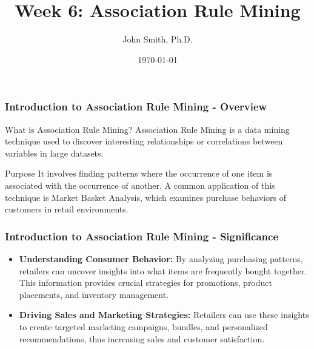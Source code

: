 \documentclass[aspectratio=169]{beamer}
\title[Association Rule Mining]{Week 6: Association Rule Mining}
\author[J. Smith]{John Smith, Ph.D.}
\institute[University Name]{
  Department of Computer Science\\
  University Name\\
  \vspace{0.3cm}
  Email: email@university.edu\\
  Website: www.university.edu
}
\date{\today}
\begin{document}
\frame{\titlepage}

\begin{frame}[fragile]
    \frametitle{Introduction to Association Rule Mining - Overview}
    \begin{block}{What is Association Rule Mining?}
        Association Rule Mining is a data mining technique used to discover interesting relationships or correlations between variables in large datasets.
    \end{block}
    \begin{block}{Purpose}
        It involves finding patterns where the occurrence of one item is associated with the occurrence of another. A common application of this technique is Market Basket Analysis, which examines purchase behaviors of customers in retail environments.
    \end{block}
\end{frame}

\begin{frame}[fragile]
    \frametitle{Introduction to Association Rule Mining - Significance}
    \begin{itemize}
        \item \textbf{Understanding Consumer Behavior:} 
        By analyzing purchasing patterns, retailers can uncover insights into what items are frequently bought together. This information provides crucial strategies for promotions, product placements, and inventory management.
        
        \item \textbf{Driving Sales and Marketing Strategies:} 
        Retailers can use these insights to create targeted marketing campaigns, bundles, and personalized recommendations, thus increasing sales and customer satisfaction.
    \end{itemize}
\end{frame}
\end{document}
